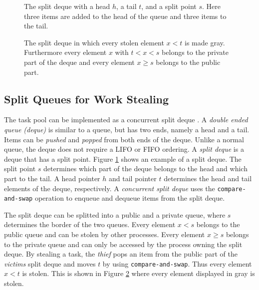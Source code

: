 \begin{figure}
	\centering
	
	\caption{The split deque with a head $h$, a tail $t$, and a split point $s$. Here three items are added to the head of the queue and three items to the tail.}
	\label{fig:deque1}
\end{figure}

\begin{figure}
	\centering
	
	\caption{The split deque in which every stolen element $x < t$ is made gray. Furthermore every element $x$ with $t < x < s$ belongs to the private part of the deque and every element $x \geq s$ belongs to the public part.}
	\label{fig:deque2}
\end{figure}

\subsection{Split Queues for Work Stealing}
The task pool can be implemented as a concurrent split deque \cite{lace}. A \emph{double ended queue (deque)} is similar to a queue, but has two ends, namely a head and a tail. Items can be \emph{pushed} and \emph{popped} from both ends of the deque. Unlike a normal queue, the deque does not require a LIFO or FIFO ordering. A \emph{split deque} is a deque that has a split point. Figure \ref{fig:deque1} shows an example of a split deque. The split point $s$ determines which part of the deque belongs to the head and which part to the tail. A head pointer $h$ and tail pointer $t$ determines the head and tail elements of the deque, respectively. A \emph{concurrent split deque} uses the \texttt{compare-and-swap} operation to enqueue and dequeue items from the split deque. 

The split deque can be splitted into a public and a private queue, where $s$ determines the border of the two queues. Every element $x < s$ belongs to the public queue and can be stolen by other processes. Every element $x \geq s$ belongs to the private queue and can only be accessed by the process owning the split deque. By stealing a task, the \emph{thief} pops an item from the public part of the \emph{victims} split deque and moves $t$ by using \texttt{compare-and-swap}. Thus every element $x < t$ is stolen. This is shown in Figure \ref{fig:deque2} where every element displayed in gray is stolen. 

